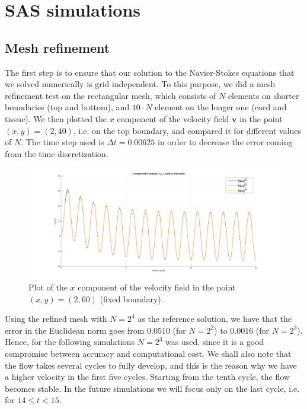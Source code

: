 \documentclass[a4paper,11pt,oneside]{book}
\begin{document}
\chapter{SAS simulations}

\section{Mesh refinement}
The first step is to ensure that our solution to the Navier-Stokes equations that we solved numerically is grid independent. To this purpose, we did a mesh refinement test on the rectangular mesh, which consists of $N$ elements on shorter boundaries (top and bottom), and $10 \cdot N$ element on the longer one (cord and tissue). We then plotted the $x$ component of the velocity field $\mathbf{v}$ in the point $(x,y) = (2, 40)$, i.e. on the top boundary, and compared it for different values of $N$. The time step used is $\Delta t = 0.00625$ in order to decrease the error coming from the time discretization. 

\begin{figure}[h!]
\centering
\includegraphics[width=\textwidth]{images/mesh_refinement.png}
\caption{Plot of the $x$ component of the velocity field in the point $(x,y)=(2,60)$ (fixed boundary).}
\label{img:sas:1}
\end{figure}
Using the refined mesh with $N=2^4$ as the reference solution, we have that the error in the Euclidean norm goes from $0.0510$ (for $N=2^2$) to $0.0016$ (for $N=2^3$). Hence, for the following simulations $N=2^3$ was used, since it is a good compromise between accuracy and computational cost.
We shall also note that the flow takes several cycles to fully develop, and this is the reason why we have a higher velocity in the first five cycles. Starting from the tenth cycle, the flow becomes stable. In the future simulations we will focus only on the last cycle, i.e. for $14 \leq t < 15$. \\
\end{document}
